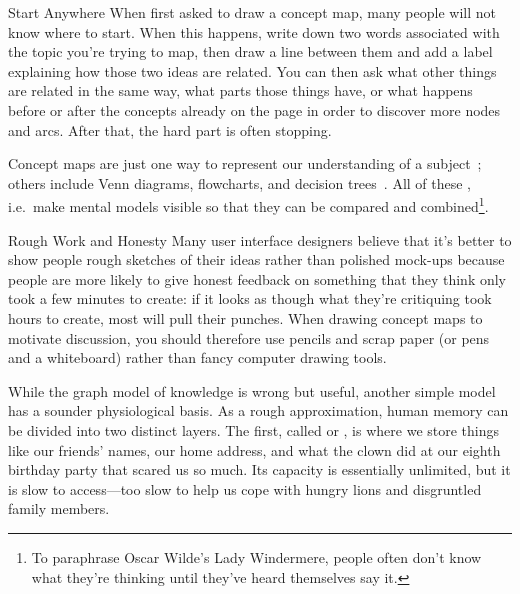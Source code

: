 \begin{aside}{Start Anywhere}
  When first asked to draw a concept map, many people will not know where to start.
  When this happens,
  write down two words associated with the topic you're trying to map,
  then draw a line between them and add a label explaining how those two ideas are related.
  You can then ask what other things are related in the same way,
  what parts those things have,
  or what happens before or after the concepts already on the page
  in order to discover more nodes and arcs.
  After that, the hard part is often stopping.
\end{aside}

Concept maps are just one way to represent our understanding of a subject~\cite{Eppl2006};
others include Venn diagrams, flowcharts, and decision trees~\cite{Abel2009}.
All of these ,
i.e.\ make mental models visible so that they can be compared and combined\footnote{To paraphrase
Oscar Wilde's Lady Windermere,
people often don't know what they're thinking until they've heard themselves say it.}.

\begin{aside}{Rough Work and Honesty}
  Many user interface designers believe that
  it's better to show people rough sketches of their ideas rather than polished mock-ups
  because people are more likely to give honest feedback on something that they think
  only took a few minutes to create:
  if it looks as though what they're critiquing took hours to create,
  most will pull their punches.
  When drawing concept maps to motivate discussion,
  you should therefore use pencils and scrap paper (or pens and a whiteboard)
  rather than fancy computer drawing tools.
\end{aside}


While the graph model of knowledge is wrong but useful,
another simple model has a sounder physiological basis.
As a rough approximation,
human memory can be divided into two distinct layers.
The first,
called 
or ,
is where we store things like our friends' names,
our home address,
and what the clown did at our eighth birthday party that scared us so much.
Its capacity is essentially unlimited,
but it is slow to access---too slow to help us cope with hungry lions and disgruntled family members.

